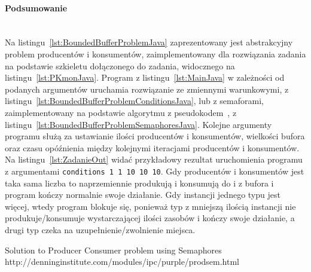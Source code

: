 \paragraph{Podsumowanie}~\\
Na listingu~\ref{lst:BoundedBufferProblemJava} zaprezentowany jest abstrakcyjny problem producentów i konsumentów, zaimplementowany dla rozwiązania zadania na podstawie szkieletu dołączonego do zadania, widocznego na listingu~\ref{lst:PKmonJava}.
Program z listingu~\ref{lst:MainJava} w zależności od podanych argumentów uruchamia rozwiązanie ze zmiennymi warunkowymi, z listingu~\ref{lst:BoundedBufferProblemConditionsJava}, lub z semaforami, zaimplementowany na podstawie algorytmu z pseudokodem~\cite{SolutionToProducerConsumerProblemUsingSemaphores}, z listingu~\ref{lst:BoundedBufferProblemSemaphoresJava}.
Kolejne argumenty programu służą za ustawianie ilości producentów i konsumentów, wielkości bufora oraz czasu opóźnienia między kolejnymi iteracjami producentów i konsumentów.
Na listingu~\ref{lst:ZadanieOut} widać przykładowy rezultat uruchomienia programu z argumentami \texttt{conditions 1 1 10 10 10}.
Gdy producentów i konsumentów jest taka sama liczba to naprzemiennie produkują i konsumują do i z bufora i program kończy normalnie swoje działanie.
Gdy instancji jednego typu jest więcej, wtedy program blokuje się, ponieważ typ z mniejszą ilością instancji nie produkuje/konsumuje wystarczającej ilości zasobów i kończy swoje działanie, a drugi typ czeka na uzupełnienie/zwolnienie miejsca.

\begin{thebibliography}{9}
       Solution to Producer Consumer problem using Semaphores http://denninginstitute.com/modules/ipc/purple/prodsem.html
\end{thebibliography}
